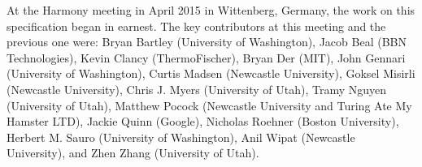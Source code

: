 At the Harmony meeting in April 2015 in Wittenberg, Germany, the work on this specification began in earnest.  The key contributors at this meeting and the previous one were: Bryan Bartley (University of Washington), Jacob Beal (BBN Technologies), Kevin Clancy (ThermoFischer), Bryan Der (MIT), John Gennari (University of Washington), Curtis Madsen (Newcastle University), Goksel Misirli (Newcastle University), Chris J. Myers (University of Utah), Tramy Nguyen (University of Utah), Matthew Pocock (Newcastle University and Turing Ate My Hamster LTD), Jackie Quinn (Google), Nicholas Roehner (Boston University), Herbert M. Sauro (University of Washington), Anil Wipat (Newcastle University), and Zhen Zhang (University of Utah).


